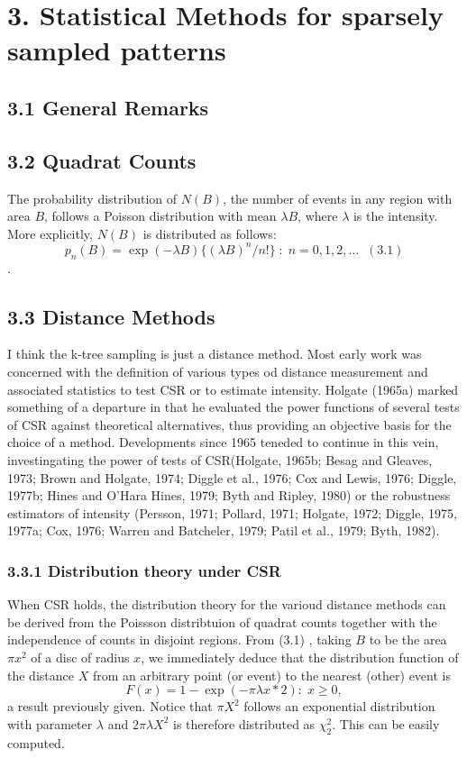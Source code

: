 \documentclass{article}
\begin{document}
\section*{3. Statistical Methods for sparsely sampled patterns}
\subsection*{3.1 General Remarks}
\subsection*{3.2 Quadrat Counts}
The probability distribution of $N(B)$, the number of events in any region with area $B$, follows a Poisson distribution with mean $\lambda B$, where $\lambda$ is the intensity. More explicitly, $N(B)$ is distributed as follows: $$p_n(B) = \exp (-\lambda B) \{ (\lambda B)^n / n!\} \; : \; n = 0, 1, 2, \dots\; \; (3.1)$$. 

\subsection*{3.3 Distance Methods}
I think the k-tree sampling is just a distance method. Most early work was concerned with the definition of various types od distance measurement and associated statistics to test CSR or to estimate intensity. Holgate (1965a) marked something of a departure in that he evaluated the power functions of several tests of CSR against theoretical alternatives, thus providing an objective basis for the choice of a method. Developments since 1965 teneded to continue in this vein, investingating the power of tests of CSR(Holgate, 1965b; Besag and Gleaves, 1973; Brown and Holgate, 1974; Diggle et al., 1976; Cox and Lewis, 1976; Diggle, 1977b; Hines and O'Hara Hines, 1979; Byth and Ripley, 1980) or the robustness estimators of intensity (Persson, 1971; Pollard, 1971; Holgate, 1972; Diggle, 1975, 1977a; Cox, 1976; Warren and Batcheler, 1979; Patil et al., 1979; Byth, 1982). 
\subsubsection*{3.3.1 Distribution theory under CSR}
When CSR holds, the distribution theory for the varioud distance methods can be derived from the Poissson distribtuion of quadrat counts together with the independence of counts in disjoint regions. From (3.1) , taking $B$ to be the area $\pi x^2$ of a disc of radius $x$, we immediately deduce that the distribution function of the distance $X$ from an arbitrary point (or event) to the nearest (other) event is $$F(x) = 1-\exp(-\pi \lambda x*2):\; x\geq 0,$$ a result previously given. Notice that $\pi X^2$ follows an exponential distribution with parameter $\lambda$ and $2\pi \lambda X^2$ is therefore distributed as $\chi_2^2$. This can be easily computed.
\end{document}
